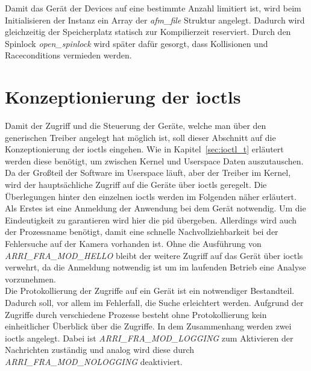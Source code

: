 Damit das Gerät der Devices auf eine bestimmte Anzahl limitiert ist, wird beim Initialisieren der Instanz ein Array der \textit{afm\_file} Struktur angelegt. Dadurch wird gleichzeitig der Speicherplatz statisch zur Kompilierzeit reserviert. Durch den Spinlock \textit{open\_spinlock} wird später dafür gesorgt, dass Kollisionen und Raceconditions vermieden werden.


\section{Konzeptionierung der \acl{ioctl}s}\label{sec:ioctl}
Damit der Zugriff und die Steuerung der Geräte, welche man über den generischen Treiber angelegt hat möglich ist, soll dieser Abschnitt auf die Konzeptionierung der \ac{ioctl}s eingehen.
Wie in Kapitel~\ref{sec:ioctl_t} erläutert werden diese benötigt, um zwischen Kernel und Userspace Daten auszutauschen. Da der Großteil der Software im Userspace läuft, aber der Treiber im Kernel, wird der hauptsächliche Zugriff auf die Geräte über \ac{ioctl}s geregelt. Die Überlegungen hinter den einzelnen \ac{ioctl}s werden im Folgenden näher erläutert.\\


Als Erstes ist eine Anmeldung der Anwendung bei dem Gerät notwendig. Um die Eindeutigkeit zu garantieren wird hier die \ac{pid} übergeben. Allerdings wird auch der Prozessname benötigt, damit eine schnelle Nachvollziehbarkeit bei der Fehlersuche auf der Kamera vorhanden ist.
Ohne die Ausführung von \textit{ARRI\_FRA\_MOD\_HELLO} bleibt der weitere Zugriff auf das Gerät über \ac{ioctl}s verwehrt, da die Anmeldung notwendig ist um im laufenden Betrieb eine Analyse vorzunehmen.\\

Die Protokollierung der Zugriffe auf ein Gerät ist ein notwendiger Bestandteil. Dadurch soll, vor allem im Fehlerfall, die Suche erleichtert werden. Aufgrund der Zugriffe durch verschiedene Prozesse besteht ohne Protokollierung kein einheitlicher Überblick über die Zugriffe.
In dem Zusammenhang werden zwei \ac{ioctl}s angelegt. Dabei ist \textit{ARRI\_FRA\_MOD\_LOGGING} zum Aktivieren der Nachrichten zuständig und analog wird diese durch \textit{ARRI\_FRA\_MOD\_NOLOGGING} deaktiviert. \\

